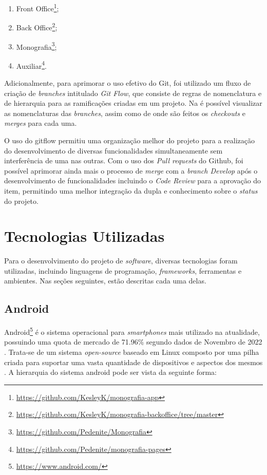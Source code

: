 \begin{enumerate}
    \item Front Office\footnote{\url{https://github.com/KesleyK/monografia-app}};
    \item Back Office\footnote{\url{https://github.com/KesleyK/monografia-backoffice/tree/master}};
    \item Monografia\footnote{\url{https://github.com/Pedenite/Monografia}};
    \item Auxiliar\footnote{\url{https://github.com/Pedenite/monografia-pages}}.
\end{enumerate}

Adicionalmente, para aprimorar o uso efetivo do Git, foi utilizado um fluxo de criação de \textit{branches} intitulado \textit{Git Flow}, que consiste de regras de nomenclatura e de hierarquia para as ramificações criadas em um projeto. Na  é possível visualizar as nomenclaturas das \textit{branches}, assim como de onde são feitos os \textit{checkouts} e \textit{merges} para cada uma.


O uso do gitflow permitiu uma organização melhor do projeto para a realização do desenvolvimento de diversas funcionalidades simultaneamente sem interferência de uma nas outras. Com o uso dos \textit{Pull requests} do Github, foi possível aprimorar ainda mais o processo de \textit{merge} com a \textit{branch Develop} após o desenvolvimento de funcionalidades incluindo o \textit{Code Review} para a aprovação do item, permitindo uma melhor integração da dupla e conhecimento sobre o \textit{status} do projeto.

\section{Tecnologias Utilizadas}

Para o desenvolvimento do projeto de \textit{software}, diversas tecnologias foram utilizadas, incluindo linguagens de programação, \textit{frameworks}, ferramentas e ambientes. Nas seções seguintes, estão descritas cada uma delas.

\subsection{Android}

Android\footnote{\url{https://www.android.com/}} é o sistema operacional para \textit{smartphones} mais utilizado na atualidade, possuindo uma quota de mercado de 71.96\% segundo dados de Novembro de 2022 \cite{mobile-os}. Trata-se de um sistema \textit{open-source} baseado em Linux composto por uma pilha criada para suportar uma vasta quantidade de dispositivos e aspectos dos mesmos \cite{android}. A hierarquia do sistema android pode ser vista da seguinte forma:

